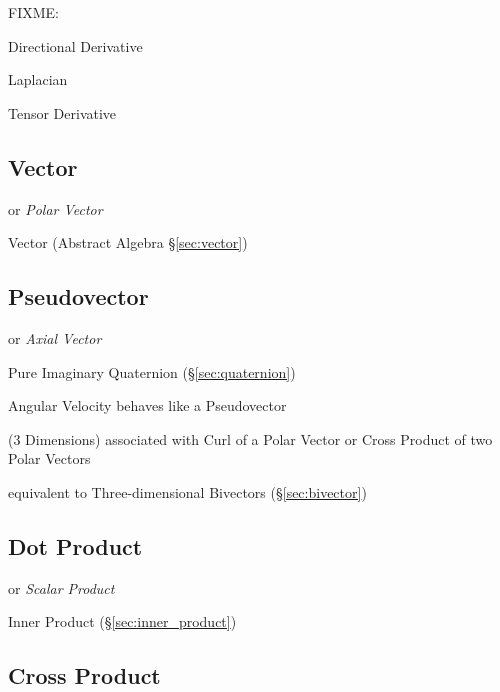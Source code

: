 FIXME:

Directional Derivative

Laplacian

Tensor Derivative



\subsection{Vector}\label{sec:linear_vector}

or \emph{Polar Vector}

\fist Vector (Abstract Algebra \S\ref{sec:vector})



\subsection{Pseudovector}\label{sec:pseudovector}

or \emph{Axial Vector}

\fist Pure Imaginary Quaternion (\S\ref{sec:quaternion})

Angular Velocity behaves like a Pseudovector

(3 Dimensions) associated with Curl of a Polar Vector or Cross Product of two
Polar Vectors

equivalent to Three-dimensional Bivectors (\S\ref{sec:bivector})



\subsection{Dot Product}\label{sec:dot_product}

or \emph{Scalar Product}

Inner Product (\S\ref{sec:inner_product})



\subsection{Cross Product}\label{sec:cross_product}

